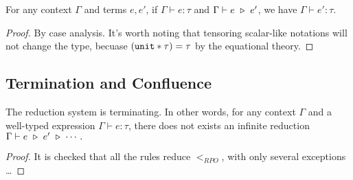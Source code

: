 
\begin{lemma}
  For any context $\Gamma$ and terms $e, e'$, if $\Gamma \vdash e : \tau$ and $\Gamma \vdash e \ \triangleright\  e'$, we have
  $ \Gamma \vdash e' : \tau $. 
\end{lemma}
\begin{proof}
  By case analysis. It's worth noting that tensoring scalar-like notations will not change the type, becuase $(\texttt{unit} * \tau) = \tau$ by the equational theory.
\end{proof}

\subsection{Termination and Confluence}

\begin{lemma}[termination]
  The reduction system is terminating. In other words, for any context $\Gamma$ and a well-typed expression $\Gamma \vdash e : \tau$, there does not exists an infinite reduction $\Gamma \vdash e \ \triangleright\  e' \ \triangleright\ \cdots .$
\end{lemma}
\begin{proof}
  It is checked that all the rules reduce $<_{RPO}$, with only several exceptions \dots {}
\end{proof}


